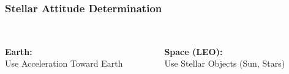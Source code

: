 \documentclass[11pt]{beamer}
\begin{document}
    \begin{frame}
        \frametitle{Stellar Attitude Determination}
        \begin{columns}
            \begin{column}{0.5\textwidth}
                 \\
                \textbf{Earth: \\} Use Acceleration Toward Earth
            \end{column}
            \begin{column}{0.5\textwidth}
                 \\
                \textbf{Space (LEO): \\} Use Stellar Objects (Sun, Stars)
            \end{column}
        \end{columns}
    \end{frame}
\end{document}
